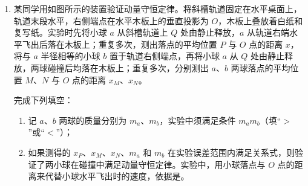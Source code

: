 \documentclass[\gkver]{gaokaozhenti}
\begin{document}
\begin{enumerate}
{故选 AD。
}

\item
某同学用如图所示的装置验证动量守恒定律。将斜槽轨道固定在水平桌面上，轨道末段水平，右侧端点在水平木板上的垂直投影为 $O$，木板上叠放着白纸和复写纸。实验时先将小球 $a$ 从斜槽轨道上 $Q$ 处由静止释放，$a$ 从轨道右端水平飞出后落在木板上；重复多次，测出落点的平均位置 $P$ 与 $O$ 点的距离 $x$，将与 $a$ 半径相等的小球 $b$ 置于轨道右侧端点，再将小球 $a$ 从 $Q$ 处由静止释放，两球碰撞后均落在木板上；重复多次，分别测出 $a$、$b$ 两球落点的平均位置 $M$、$N$ 与 $O$ 点的距离 $x_{M}$、$x_{N}$。

完成下列填空：
\begin{enumerate}
	\item
	记 $a$、$b$ 两球的质量分别为 $m_{a}$、$m_{b}$，实验中须满足条件 $m_{a}$\tkanswer{>}$m_{b}$（填“$>$”或“$<$”）；
	\item
	如果测得的 $x_{P}$、$x_{M}$、$x_{N}$、$m_{a}$ 和 $m_{b}$ 在实验误差范围内满足关系式，则验证了两小球在碰撞中满足动量守恒定律。实验中，用小球落点与 $O$ 点的距离来代替小球水平飞出时的速度，依据是。
\end{enumerate}
\end{enumerate}
\end{document}
